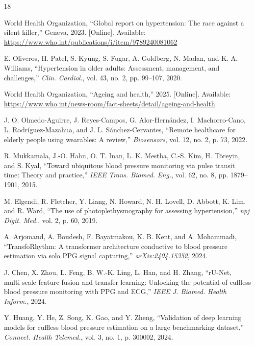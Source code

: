 \documentclass[journal]{IEEEtran}
\begin{document}
\begin{thebibliography}{18}

 World Health Organization, ``Global report on hypertension: The race against a silent killer,'' Geneva, 2023. [Online]. Available: \url{https://www.who.int/publications/i/item/9789240081062}

 E. Oliveros, H. Patel, S. Kyung, S. Fugar, A. Goldberg, N. Madan, and K. A. Williams, ``Hypertension in older adults: Assessment, management, and challenges,'' \textit{Clin. Cardiol.}, vol. 43, no. 2, pp. 99--107, 2020.

 World Health Organization, ``Ageing and health,'' 2025. [Online]. Available: \url{https://www.who.int/news-room/fact-sheets/detail/ageing-and-health}

 J. O. Olmedo-Aguirre, J. Reyes-Campos, G. Alor-Hern\'andez, I. Machorro-Cano, L. Rodr\'iguez-Mazahua, and J. L. S\'anchez-Cervantes, ``Remote healthcare for elderly people using wearables: A review,'' \textit{Biosensors}, vol. 12, no. 2, p. 73, 2022.

 R. Mukkamala, J.-O. Hahn, O. T. Inan, L. K. Mestha, C.-S. Kim, H. T\"oreyin, and S. Kyal, ``Toward ubiquitous blood pressure monitoring via pulse transit time: Theory and practice,'' \textit{IEEE Trans. Biomed. Eng.}, vol. 62, no. 8, pp. 1879--1901, 2015.

 M. Elgendi, R. Fletcher, Y. Liang, N. Howard, N. H. Lovell, D. Abbott, K. Lim, and R. Ward, ``The use of photoplethysmography for assessing hypertension,'' \textit{npj Digit. Med.}, vol. 2, p. 60, 2019.

 A. Arjomand, A. Boudesh, F. Bayatmakou, K. B. Kent, and A. Mohammadi, ``TransfoRhythm: A transformer architecture conductive to blood pressure estimation via solo PPG signal capturing,'' \textit{arXiv:2404.15352}, 2024.

 J. Chen, X. Zhou, L. Feng, B. W.-K. Ling, L. Han, and H. Zhang, ``rU-Net, multi-scale feature fusion and transfer learning: Unlocking the potential of cuffless blood pressure monitoring with PPG and ECG,'' \textit{IEEE J. Biomed. Health Inform.}, 2024.

 Y. Huang, Y. He, Z. Song, K. Gao, and Y. Zheng, ``Validation of deep learning models for cuffless blood pressure estimation on a large benchmarking dataset,'' \textit{Connect. Health Telemed.}, vol. 3, no. 1, p. 300002, 2024.


\end{thebibliography}
\end{document}
